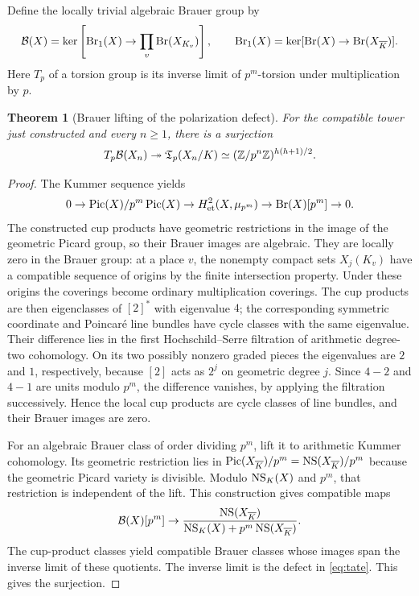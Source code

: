 \documentclass[11pt,a4paper]{article}
\newtheorem{theorem}{Theorem}[section]
\theoremstyle{definition}\newtheorem{definition}[theorem]{Definition}
\theoremstyle{remark}\newtheorem{remark}[theorem]{Remark}
\newcommand{\ZZ}{\mathbb Z}\newcommand{\QQ}{\mathbb Q}\newcommand{\FF}{\mathbb F}
\numberwithin{equation}{section}
\begin{document}
Define the locally trivial algebraic Brauer group by
\[
\mathcal B(X)=\ker\left[\operatorname{Br}_1(X)\to\prod_v\operatorname{Br}(X_{K_v})\right],\qquad
\operatorname{Br}_1(X)=\ker[\operatorname{Br}(X)\to\operatorname{Br}(X_{\overline K})].
\]
Here $T_p$ of a torsion group is its inverse limit of $p^m$-torsion under multiplication by $p$.
\begin{theorem}[Brauer lifting of the polarization defect]\label{thm:brauer}
For the compatible tower just constructed and every $n\geq1$, there is a surjection
\begin{equation}\label{eq:brauer}
T_p\mathcal B(X_n)\twoheadrightarrow\Tdef_p(X_n/K)
\simeq(\ZZ/p^n\ZZ)^{h(h+1)/2}.
\end{equation}
\end{theorem}
\begin{proof}
The Kummer sequence yields
\[
0\to\operatorname{Pic}(X)/p^m\operatorname{Pic}(X)\to H^2_{\mathrm{et}}(X,\mu_{p^m})
\to\operatorname{Br}(X)[p^m]\to0.
\]
The constructed cup products have geometric restrictions in the image of the geometric Picard group, so their Brauer images are algebraic. They are locally zero in the Brauer group: at a place $v$, the nonempty compact sets $X_j(K_v)$ have a compatible sequence of origins by the finite intersection property. Under these origins the coverings become ordinary multiplication coverings. The cup products are then eigenclasses of $[2]^*$ with eigenvalue $4$; the corresponding symmetric coordinate and Poincar\'{e} line bundles have cycle classes with the same eigenvalue. Their difference lies in the first Hochschild--Serre filtration of arithmetic degree-two cohomology. On its two possibly nonzero graded pieces the eigenvalues are $2$ and $1$, respectively, because $[2]$ acts as $2^j$ on geometric degree $j$. Since $4-2$ and $4-1$ are units modulo $p^m$, the difference vanishes, by applying the filtration successively. Hence the local cup products are cycle classes of line bundles, and their Brauer images are zero.

For an algebraic Brauer class of order dividing $p^m$, lift it to arithmetic Kummer cohomology. Its geometric restriction lies in $\operatorname{Pic}(X_{\overline K})/p^m=\operatorname{NS}(X_{\overline K})/p^m$ because the geometric Picard variety is divisible. Modulo $\operatorname{NS}_K(X)$ and $p^m$, that restriction is independent of the lift. This construction gives compatible maps
\[
\mathcal B(X)[p^m]\to
\frac{\operatorname{NS}(X_{\overline K})}{\operatorname{NS}_K(X)+p^m\operatorname{NS}(X_{\overline K})}.
\]
The cup-product classes yield compatible Brauer classes whose images span the inverse limit of these quotients. The inverse limit is the defect in \eqref{eq:tate}. This gives the surjection.
\end{proof}
\end{document}
